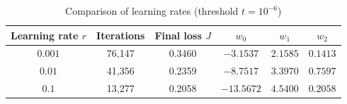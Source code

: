 \documentclass{article}
\begin{document}
\begin{table}[H]
    \centering
    \begin{tabular}{cccccc}
    \toprule
    Learning rate $r$ & Iterations & Final loss $J$ & $w_0$ & $w_1$ & $w_2$ \\
    \midrule
    $0.001$ & 76,147 & 0.3460 & $-3.1537$ & $2.1585$ & $0.1413$ \\
    $0.01$  & 41,356 & 0.2359 & $-8.7517$ & $3.3970$ & $0.7597$ \\
    $0.1$   & 13,277 & 0.2058 & $-13.5672$ & $4.5400$ & $0.2058$ \\
    \bottomrule
    \end{tabular}
    \caption{Comparison of learning rates (threshold $t = 10^{-6}$)}
    \label{tab:lr}
\end{table}
\end{document}
